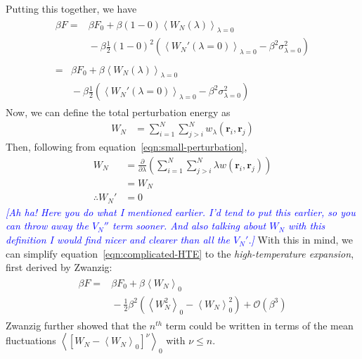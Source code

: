 \documentclass[letterpaper,twocolumn,amsmath,amssymb,prb]{revtex4-1}
\newcommand{\1}{\ensuremath{\textbf{r}_1}}
\newcommand{\2}{\ensuremath{\textbf{r}_2}}
\newcommand{\3}{\ensuremath{\textbf{r}_3}}
\newcommand{\4}{\ensuremath{\textbf{r}_4}}
\newcommand{\davidsays}[1]{\textcolor{blue}{\textit{[#1]}}}
\begin{document}
Putting this together, we have
\begin{align}
  \begin{split}
    \beta F = &{} \beta F_0 + \beta(1 - 0)\left\langle W_N(\lambda) \right\rangle_{\lambda = 0} \\ &{} - \beta\frac{1}{2}(1 - 0)^2\left(\left\langle W_N'(\lambda = 0) \right\rangle_{\lambda = 0} - \beta^2\sigma^2_{\lambda = 0} \right)
  \end{split} \\
  \begin{split}
    =&{}  \beta F_0 + \beta\left\langle W_N(\lambda) \right\rangle_{\lambda = 0} \\ &{} - \beta\frac{1}{2}\left(\left\langle W_N'(\lambda = 0) \right\rangle_{\lambda = 0} - \beta^2\sigma^2_{\lambda = 0} \right) \label{eqn:complicated-HTE}
  \end{split}
\end{align}
Now, we can define the total perturbation energy as
\begin{align}
  W_N &= \sum_{i=1}^N\sum_{j>i}^N w_\lambda(\mathbf{r}_i,\mathbf{r}_j)
\end{align}
Then, following from equation~\ref{eqn:small-perturbation},
\begin{align}
  W_N &= \frac{\partial}{\partial\lambda}\left(\sum_{i=1}^N\sum_{j>i}^N \lambda w(\mathbf{r}_i,\mathbf{r}_j)\right) \nonumber \\
  &= W_N \\
  \therefore W_N' &= 0
\end{align}
\davidsays{Ah ha! Here you do what I mentioned earlier.  I'd tend to
  put this earlier, so you can throw away the $V_N''$ term sooner.
  And also talking about $W_N$ with this definition I would find nicer
  and clearer than all the $V_N'$.}  With this in mind, we can
simplify equation~\ref{eqn:complicated-HTE} to the
\emph{high-temperature expansion}, first derived by
Zwanzig:\cite{Zwanzig54}
\begin{align}
  \begin{split}
    \beta F = &{} \beta F_0 + \beta\left\langle W_N \right\rangle_0  \\ &{} - \frac{1}{2}\beta^2\left( \left\langle W_N^2 \right\rangle_0 - \left\langle W_N \right\rangle_0^2 \right) + \mathcal{O}(\beta^3)
  \end{split}
\end{align}
Zwanzig further showed that the $n^{th}$ term could be written in terms of the mean fluctuations $\left\langle \left[ W_N - \left\langle W_N\right\rangle_0 \right]^\nu \right\rangle_0$ with $\nu \leq n$.
\end{document}
